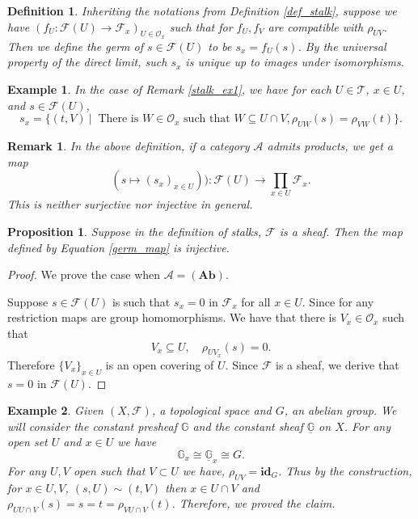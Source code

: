 \documentclass{article}
\newtheorem{proposition}{Proposition}[section]
\newtheorem{definition}{Definition}[section]
\newtheorem{remark}{Remark}[section]
\newtheorem{example}{Example}[section]
\numberwithin{equation}{section}
\begin{document}
\begin{definition}
Inheriting the notations from Definition \ref{def_stalk}, suppose we have $(f_U:\mathcal{F}(U)\to\mathcal{F}_x)_{U\in\mathcal{O}_x}$ such that for $f_U, f_V$ are compatible with $\rho_{UV}$. Then we define the germ of $s\in\mathcal{F}(U)$ to be $s_x=f_U(s)$. By the universal property of the direct limit, such $s_x$ is unique up to images under isomorphisms.
\end{definition}

\begin{example}
In the case of Remark \ref{stalk_ex1}, we have for each $U\in\mathcal{T}$, $x\in U$, and $s\in\mathcal{F}(U)$,
\begin{equation*}
s_x = \{(t,V)\:|\: \text{ There is } W\in\mathcal{O}_x \text{ such that } W\subseteq U\cap V, \rho_{UW}(s)=\rho_{VW}(t)\}.
\end{equation*}
\end{example}

\begin{remark}
In the above definition, if a category $\mathcal{A}$ admits products, we get a map
\begin{equation}
\label{germ_map}
(s\mapsto (s_x)_{x\in U})):\mathcal{F}(U)\to\prod_{x\in U}\mathcal{F}_x.
\end{equation}
This is neither surjective nor injective in general.
\end{remark}

\begin{proposition}
\label{stalk_lifting}
Suppose in the definition of stalks, $\mathcal{F}$ is a sheaf. Then the map defined by Equation \ref{germ_map} is injective.
\end{proposition}

\begin{proof}
We prove the case when $\mathcal{A}=(\mathbf{Ab})$. \\
\par Suppose $s\in\mathcal{F}(U)$ is such that $s_x=0$ in $\mathcal{F}_x$ for all $x\in U$. Since for any restriction maps are group homomorphisms. We have that there is $V_x\in\mathcal{O}_x$ such that 
\begin{equation*}
V_x\subseteq U,\quad\rho_{UV_x}(s) = 0.
\end{equation*}
Therefore $\{V_x\}_{x\in U}$ is an open covering of $U$. Since $\mathcal{F}$ is a sheaf, we derive that $s=0$ in $\mathcal{F}(U)$.
\end{proof}

\begin{example}
Given $(X,\mathcal{F})$, a topological space and $G$, an abelian group. We will consider the constant presheaf $\mathbb{G}$ and the constant sheaf $\underline{\mathbb{G}}$ on $X$. For any open set $U$ and $x\in U$ we have
\begin{equation*}
\mathbb{G}_x\cong\underline{\mathbb{G}}_x\cong G.
\end{equation*}
For any $U,V$ open such that $V\subset U$ we have, $\rho_{UV}=\mathbf{id}_G$. Thus by the construction, for $x\in U,V$, $(s,U)\sim (t,V)$ then $x\in U\cap V$ and $\rho_{UU\cap V}(s) = s=t=\rho_{VU\cap V}(t)$. Therefore, we proved the claim.
\end{example}
\end{document}
